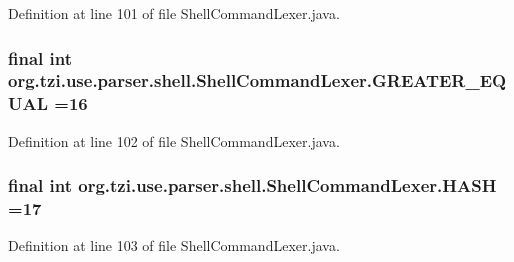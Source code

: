Definition at line 101 of file Shell\-Command\-Lexer.\-java.

\hypertarget{classorg_1_1tzi_1_1use_1_1parser_1_1shell_1_1_shell_command_lexer_aa761ff883ca99c372bf6752f18e4b142}{
\subsubsection[{G\-R\-E\-A\-T\-E\-R\-\_\-\-E\-Q\-U\-A\-L}]{\setlength{\rightskip}{0pt plus 5cm}final int org.\-tzi.\-use.\-parser.\-shell.\-Shell\-Command\-Lexer.\-G\-R\-E\-A\-T\-E\-R\-\_\-\-E\-Q\-U\-A\-L =16\hspace{0.3cm}{\ttfamily [static]}}}\label{classorg_1_1tzi_1_1use_1_1parser_1_1shell_1_1_shell_command_lexer_aa761ff883ca99c372bf6752f18e4b142}


Definition at line 102 of file Shell\-Command\-Lexer.\-java.

\hypertarget{classorg_1_1tzi_1_1use_1_1parser_1_1shell_1_1_shell_command_lexer_a0ead90eb3cbcab7937c65af13b48a2c9}{
\subsubsection[{H\-A\-S\-H}]{\setlength{\rightskip}{0pt plus 5cm}final int org.\-tzi.\-use.\-parser.\-shell.\-Shell\-Command\-Lexer.\-H\-A\-S\-H =17\hspace{0.3cm}{\ttfamily [static]}}}\label{classorg_1_1tzi_1_1use_1_1parser_1_1shell_1_1_shell_command_lexer_a0ead90eb3cbcab7937c65af13b48a2c9}


Definition at line 103 of file Shell\-Command\-Lexer.\-java.

